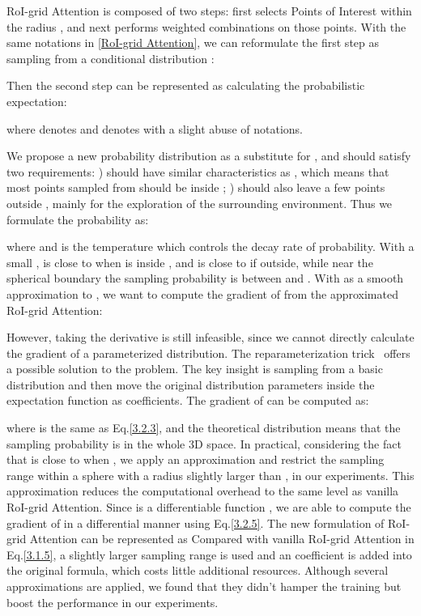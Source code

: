 \documentclass[10pt,twocolumn,letterpaper]{article}
\begin{document}
RoI-grid Attention is composed of two steps: first selects Points of Interest within the radius , and next performs weighted combinations on those points. With the same notations in \ref{RoI-grid Attention}, we can reformulate the first step as sampling from a conditional distribution :

Then the second step can be represented as calculating the probabilistic expectation:

where  denotes  and  denotes  with a slight abuse of notations. 

We propose a new probability distribution  as a substitute for , and  should satisfy two requirements: )  should have similar characteristics as , which means that most points sampled from  should be inside ; )  should also leave a few points outside , mainly for the exploration of the surrounding environment. Thus we formulate the probability  as:

where  and  is the temperature which controls the decay rate of probability. With a small ,  is close to  when  is inside , and is close to  if outside, while near the spherical boundary the sampling probability  is between  and . With  as a smooth approximation to , we want to compute the gradient of  from the approximated RoI-grid Attention:


However, taking the derivative \wrt  is still infeasible, since we cannot directly calculate the gradient of a parameterized distribution. The reparameterization trick~\cite{kingma2013auto} offers a possible solution to the problem. The key insight is sampling from a basic distribution and then move the original distribution parameters inside the expectation function as coefficients. The gradient of  can be computed as:

where  is the same as Eq.\ref{3.2.3}, and the theoretical distribution  means that the sampling probability is  in the whole 3D space. In practical, considering the fact that  is close to  when , we apply an approximation and restrict the sampling range  within a sphere with a radius slightly larger than , \ie  in our experiments. This approximation reduces the computational overhead to the same level as vanilla RoI-grid Attention. Since  is a differentiable function \wrt , we are able to compute the gradient of  in a differential manner using Eq.\ref{3.2.5}. The new formulation of RoI-grid Attention can be represented as 
Compared with vanilla RoI-grid Attention in Eq.\ref{3.1.5}, a slightly larger sampling range  is used and an coefficient  is added into the original formula, which costs little additional resources. Although several approximations are applied, we found that they didn't hamper the training but boost the performance in our experiments. 
\end{document}
